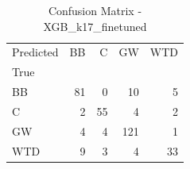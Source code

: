 \begin{table}
\caption{Confusion Matrix - XGB_k17_finetuned}
\begin{tabular}{lrrrr}
\toprule
Predicted & BB & C & GW & WTD \\
True &  &  &  &  \\
\midrule
BB & 81 & 0 & 10 & 5 \\
C & 2 & 55 & 4 & 2 \\
GW & 4 & 4 & 121 & 1 \\
WTD & 9 & 3 & 4 & 33 \\
\bottomrule
\end{tabular}
\end{table}
